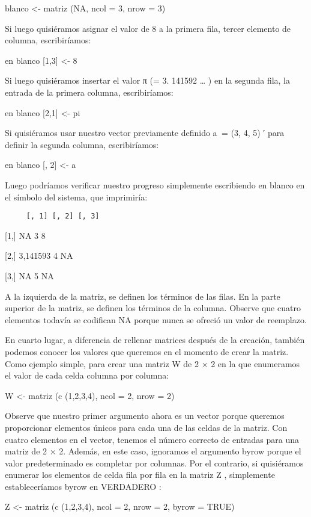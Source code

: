 \documentclass[
]{book}
\begin{document}
blanco \textless- matriz (NA, ncol = 3, nrow = 3)

Si luego quisiéramos asignar el valor de 8 a la primera fila, tercer elemento de columna, escribiríamos:

en blanco {[}1,3{]} \textless- 8

Si luego quisiéramos insertar el valor π (= 3. 141592 \ldots{} ) en la segunda fila, la entrada de la primera columna, escribiríamos:

en blanco {[}2,1{]} \textless- pi

Si quisiéramos usar nuestro vector previamente definido a  = (3, 4, 5) ′ para definir la segunda columna, escribiríamos:

en blanco {[}, 2{]} \textless- a

Luego podríamos verificar nuestro progreso simplemente escribiendo en blanco en el símbolo del sistema, que imprimiría:

\begin{verbatim}
     [, 1] [, 2] [, 3]
\end{verbatim}

{[}1,{]} NA 3 8

{[}2,{]} 3,141593 4 NA

{[}3,{]} NA 5 NA

A la izquierda de la matriz, se definen los términos de las filas. En la parte superior de la matriz, se definen los términos de la columna. Observe que cuatro elementos todavía se codifican NA porque nunca se ofreció un valor de reemplazo.

En cuarto lugar, a diferencia de rellenar matrices después de la creación, también podemos conocer los valores que queremos en el momento de crear la matriz. Como ejemplo simple, para crear una matriz W de 2 × 2 en la que enumeramos el valor de cada celda columna por columna:

W \textless- matriz (c (1,2,3,4), ncol = 2, nrow = 2)

Observe que nuestro primer argumento ahora es un vector porque queremos proporcionar elementos únicos para cada una de las celdas de la matriz. Con cuatro elementos en el vector, tenemos el número correcto de entradas para una matriz de 2 × 2. Además, en este caso, ignoramos el argumento byrow porque el valor predeterminado es completar por columnas. Por el contrario, si quisiéramos enumerar los elementos de celda fila por fila en la matriz Z , simplemente estableceríamos byrow en VERDADERO :

Z \textless- matriz (c (1,2,3,4), ncol = 2, nrow = 2, byrow = TRUE)
\end{document}
